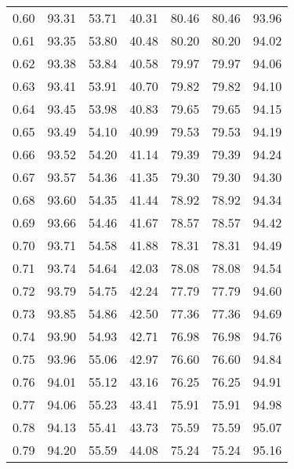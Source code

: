\begin{tabular}{|c|c|c|c|c|c|c|}
      0.60 &     93.31 &     53.71 &      40.31 &   80.46 &      80.46 &         93.96 \\
      0.61 &     93.35 &     53.80 &      40.48 &   80.20 &      80.20 &         94.02 \\
      0.62 &     93.38 &     53.84 &      40.58 &   79.97 &      79.97 &         94.06 \\
      0.63 &     93.41 &     53.91 &      40.70 &   79.82 &      79.82 &         94.10 \\
      0.64 &     93.45 &     53.98 &      40.83 &   79.65 &      79.65 &         94.15 \\
      0.65 &     93.49 &     54.10 &      40.99 &   79.53 &      79.53 &         94.19 \\
      0.66 &     93.52 &     54.20 &      41.14 &   79.39 &      79.39 &         94.24 \\
      0.67 &     93.57 &     54.36 &      41.35 &   79.30 &      79.30 &         94.30 \\
      0.68 &     93.60 &     54.35 &      41.44 &   78.92 &      78.92 &         94.34 \\
      0.69 &     93.66 &     54.46 &      41.67 &   78.57 &      78.57 &         94.42 \\
      0.70 &     93.71 &     54.58 &      41.88 &   78.31 &      78.31 &         94.49 \\
      0.71 &     93.74 &     54.64 &      42.03 &   78.08 &      78.08 &         94.54 \\
      0.72 &     93.79 &     54.75 &      42.24 &   77.79 &      77.79 &         94.60 \\
      0.73 &     93.85 &     54.86 &      42.50 &   77.36 &      77.36 &         94.69 \\
      0.74 &     93.90 &     54.93 &      42.71 &   76.98 &      76.98 &         94.76 \\
      0.75 &     93.96 &     55.06 &      42.97 &   76.60 &      76.60 &         94.84 \\
      0.76 &     94.01 &     55.12 &      43.16 &   76.25 &      76.25 &         94.91 \\
      0.77 &     94.06 &     55.23 &      43.41 &   75.91 &      75.91 &         94.98 \\
      0.78 &     94.13 &     55.41 &      43.73 &   75.59 &      75.59 &         95.07 \\
      0.79 &     94.20 &     55.59 &      44.08 &   75.24 &      75.24 &         95.16 \\

\end{tabular}
